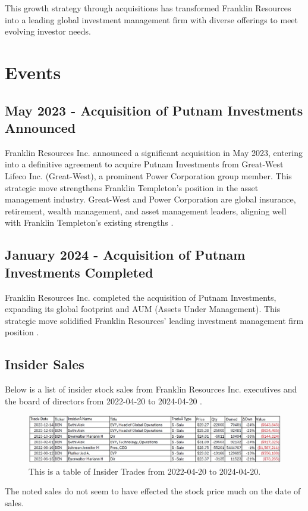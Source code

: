 \documentclass[9pt,a4paper,twoside]{tau}
\begin{document}
    This growth strategy through acquisitions has transformed Franklin Resources into a leading global investment management firm with diverse offerings to meet evolving investor needs.

\section{Events}

    \subsection{May 2023 - Acquisition of Putnam Investments Announced}
	
        Franklin Resources Inc. announced a significant acquisition in May 2023, entering into a definitive agreement to acquire Putnam Investments from Great-West Lifeco Inc. (Great-West), a prominent Power Corporation group member. This strategic move strengthens Franklin Templeton’s position in the asset management industry. Great-West and Power Corporation are global insurance, retirement, wealth management, and asset management leaders, aligning well with Franklin Templeton’s existing strengths \cite{franklin-resources-inc-2023}.

    \subsection{January 2024 - Acquisition of Putnam Investments Completed}
	
        Franklin Resources Inc. completed the acquisition of Putnam Investments, expanding its global footprint and AUM (Assets Under Management). This strategic move solidified Franklin Resources’ leading investment management firm position \cite{franklin-resources-inc-2023}.
    
    \subsection{Insider Sales}
        Below is a list of insider stock sales from Franklin Resources Inc. executives and the board of directors from 2022-04-20 to 2024-04-20 \cite{open-insider-no-date}. 
            \begin{figure}[H]
                \centering
                \includegraphics[width=0.95\columnwidth]{Figures/InsiderTrades.jpg}
                \caption{This is a table of Insider Trades from 2022-04-20 to 2024-04-20.}
                \label{fig:figure}
            \end{figure}
        The noted sales do not seem to have effected the stock price much on the date of sales.
\end{document}
